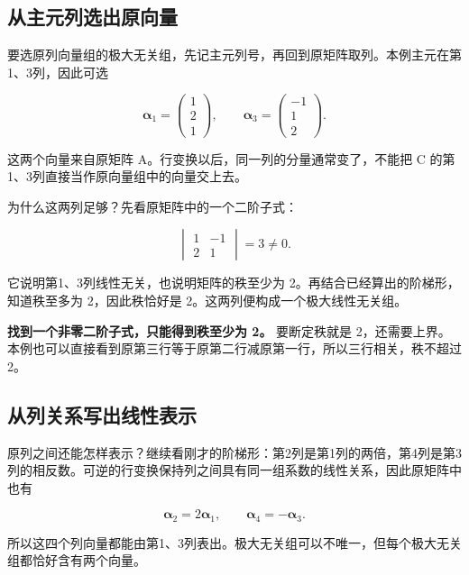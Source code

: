 \documentclass[
  11pt,
  a4paper,
  fontset=fandol]{ctexart}
\begin{document}

\subsection{从主元列选出原向量}\label{ux4eceux4e3bux5143ux5217ux9009ux51faux539fux5411ux91cf}

要选原列向量组的极大无关组，先记主元列号，再回到原矩阵取列。本例主元在第1、3列，因此可选

\[\boldsymbol\alpha_1=\begin{pmatrix}1\\2\\1\end{pmatrix},
\qquad
\boldsymbol\alpha_3=\begin{pmatrix}-1\\1\\2\end{pmatrix}.\]

这两个向量来自原矩阵 A。行变换以后，同一列的分量通常变了，不能把 C
的第1、3列直接当作原向量组中的向量交上去。

为什么这两列足够？先看原矩阵中的一个二阶子式：

\[\begin{vmatrix}1&-1\\2&1\end{vmatrix}=3\ne0.\]

它说明第1、3列线性无关，也说明矩阵的秩至少为
2。再结合已经算出的阶梯形，知道秩至多为 2，因此秩恰好是
2。这两列便构成一个极大线性无关组。

\textbf{找到一个非零二阶子式，只能得到秩至少为 2。} 要断定秩就是
2，还需要上界。本例也可以直接看到原第三行等于原第二行减原第一行，所以三行相关，秩不超过
2。


\subsection{从列关系写出线性表示}\label{ux4eceux5217ux5173ux7cfbux5199ux51faux7ebfux6027ux8868ux793a}

原列之间还能怎样表示？继续看刚才的阶梯形：第2列是第1列的两倍，第4列是第3列的相反数。可逆的行变换保持列之间具有同一组系数的线性关系，因此原矩阵中也有

\[\boldsymbol\alpha_2=2\boldsymbol\alpha_1,
\qquad
\boldsymbol\alpha_4=-\boldsymbol\alpha_3.\]

所以这四个列向量都能由第1、3列表出。极大无关组可以不唯一，但每个极大无关组都恰好含有两个向量。
\end{document}
